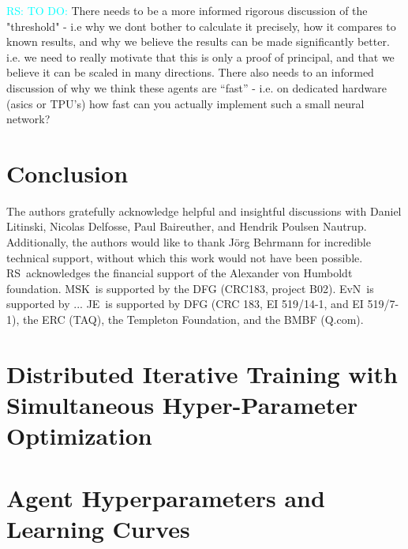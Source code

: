 \documentclass[twocolumn,preprintnumbers,amsmath,amssymb,notitlepage,nofootinbib,longbibliography,superscriptaddress,aps,pra,10pt]{revtex4-1}
\newcommand{\ryan}[1]{\textcolor{Cyan}{RS: #1}}
\begin{document}
    \ryan{TO DO:} There needs to be a more informed rigorous discussion of the "threshold" - i.e why we dont bother to calculate it precisely, how it compares to known results, and why we believe the results can be made significantly better. i.e. we need to really motivate that this is only a proof of principal, and that we believe it can be scaled in many directions. There also needs to an informed discussion of why we think these agents are ``fast'' - i.e. on dedicated hardware (asics or TPU's) how fast can you actually implement such a small neural network?

\section{Conclusion}\label{s:conclusions}


\begin{acknowledgments}
	The authors gratefully acknowledge helpful and insightful discussions with Daniel Litinski, Nicolas Delfosse, Paul Baireuther, and Hendrik Poulsen Nautrup.
	Additionally, the authors would like to thank J\"{o}rg Behrmann for incredible technical support, without which this work would not have been possible.
	RS\ acknowledges the financial support of the Alexander von Humboldt foundation.
	MSK\ is supported by the DFG (CRC183, project B02).
	EvN\ is supported by ...
	JE\ is supported by DFG (CRC 183, EI 519/14-1, and EI 519/7-1), the ERC (TAQ), the Templeton Foundation, and the BMBF (Q.com).
\end{acknowledgments}

\appendix
\section{Distributed Iterative Training with Simultaneous Hyper-Parameter Optimization}\label{A:training}
\section{Agent Hyperparameters and Learning Curves}\label{A:parameters}


\end{document}

